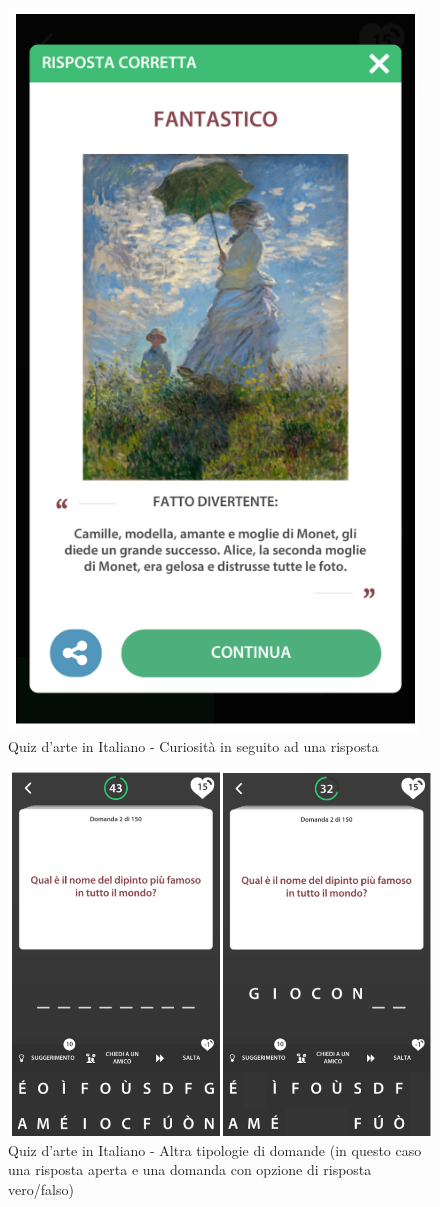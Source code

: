 \documentclass{article}
\begin{document}
\begin{figure}[htp]
\begin{center}
\includegraphics[width=0.5 \textwidth]{Figure17.png}
\caption{Quiz d’arte in Italiano - Curiosità in seguito ad una risposta}
\end{center}
\end{figure}

\begin{figure}[htp]
\begin{center}
\includegraphics[width=1 \textwidth]{Figure18.png}
\caption{Quiz d’arte in Italiano - Altra tipologie di domande (in questo caso una risposta aperta e una domanda con opzione di risposta vero/falso)}
\end{center}
\end{figure}
\end{document}
